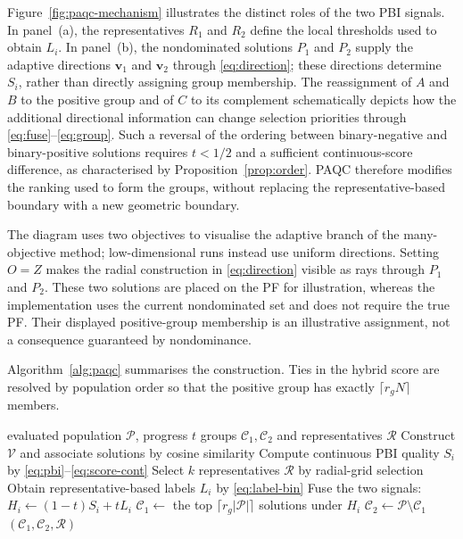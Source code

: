 \documentclass[final,5p,times,twocolumn]{elsarticle}
\newcommand{\vv}{\mathbf{v}}
\begin{document}
Figure~\ref{fig:paqc-mechanism} illustrates the distinct roles of the two PBI
signals. In panel~(a), the representatives $R_1$ and $R_2$ define the local
thresholds used to obtain $L_i$. In panel~(b), the nondominated solutions
$P_1$ and $P_2$ supply the adaptive directions $\vv_1$ and $\vv_2$ through
\eqref{eq:direction}; these directions determine $S_i$, rather than directly
assigning group membership. The reassignment of $A$ and $B$ to the positive
group and of $C$ to its complement schematically depicts how the additional
directional information can change selection priorities through
\eqref{eq:fuse}--\eqref{eq:group}. Such a reversal of the ordering between
binary-negative and binary-positive solutions requires $t<1/2$ and a
sufficient continuous-score difference, as characterised by
Proposition~\ref{prop:order}. PAQC therefore modifies the ranking used to form
the groups, without replacing the representative-based boundary with a new
geometric boundary.

The diagram uses two objectives to visualise the adaptive branch of the
many-objective method; low-dimensional runs instead use uniform directions.
Setting $O=Z$ makes the radial
construction in \eqref{eq:direction} visible as rays through $P_1$ and $P_2$.
These two solutions are placed on the PF for illustration, whereas the
implementation uses the current nondominated set and does not require the true
PF. Their displayed positive-group membership is an illustrative assignment,
not a consequence guaranteed by nondominance.

Algorithm~\ref{alg:paqc} summarises the construction. Ties in the hybrid
score are resolved by population order so that the positive group has exactly
$\lceil r_gN\rceil$ members.

\begin{algorithm}[t]
\caption{PBIQualityClassification (PAQC)}
\label{alg:paqc}
\begin{algorithmic}[1]
\Require evaluated population $\mathcal{P}$, progress $t$
\Ensure groups $\mathcal{C}_1,\mathcal{C}_2$ and representatives $\mathcal{R}$
\State Construct $\mathcal{V}$ and associate solutions by cosine similarity
\State Compute continuous PBI quality $S_i$ by \eqref{eq:pbi}--\eqref{eq:score-cont}
\State Select $k$ representatives $\mathcal{R}$ by radial-grid selection
\State Obtain representative-based labels $L_i$ by \eqref{eq:label-bin}
\State Fuse the two signals: $H_i\gets(1-t)S_i+tL_i$
\State $\mathcal{C}_1\gets$ the top $\lceil r_g|\mathcal{P}|\rceil$ solutions under $H_i$
\State $\mathcal{C}_2\gets\mathcal{P}\setminus\mathcal{C}_1$
\State \Return $(\mathcal{C}_1,\mathcal{C}_2,\mathcal{R})$
\end{algorithmic}
\end{algorithm}
\end{document}
